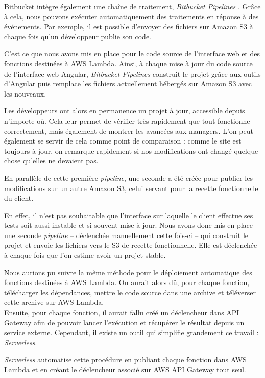 Bitbucket intègre également une chaîne de traitement,
\textit{Bitbucket Pipelines}\cite{noauthor_bitbucket_nodate-1}
. Grâce à cela, nous pouvons exécuter automatiquement des traitements en réponse à des événements. Par exemple, il est possible d'envoyer des fichiers sur Amazon S3 à chaque fois qu'un développeur publie son code.

C'est ce que nous avons mis en place pour le code source de l'interface web et des fonctions destinées à AWS Lambda.
Ainsi, à chaque mise à jour du code source de l'interface web Angular, \textit{Bitbucket Pipelines} construit le projet grâce aux outils d'Angular puis remplace les fichiers actuellement hébergés sur Amazon S3 avec les nouveaux.

Les développeurs ont alors en permanence un projet à jour, accessible depuis n'importe où.
Cela leur permet de vérifier très rapidement que tout fonctionne correctement, mais également de montrer les avancées aux managers. L'on peut également se servir de cela comme point de comparaison : comme le site est toujours à jour, on remarque rapidement si nos modifications ont changé quelque chose qu'elles ne devaient pas.

En parallèle de cette première \textit{pipeline}, une seconde a été créée pour publier les modifications sur un autre Amazon S3, celui servant pour la recette fonctionnelle du client.

En effet, il n'est pas souhaitable que l'interface sur laquelle le client effectue ses tests soit aussi instable et si souvent mise à jour. Nous avons donc mis en place une seconde \textit{pipeline} -- déclenchée manuellement cette fois-ci -- qui construit le projet et envoie les fichiers vers le S3 de recette fonctionnelle.
Elle est déclenchée à chaque fois que l'on estime avoir un projet stable.

Nous aurions pu suivre la même méthode pour le déploiement automatique des fonctions destinées à AWS Lambda. On aurait alors dû, pour chaque fonction, télécharger les dépendances, mettre le code source dans une archive et téléverser cette archive sur AWS Lambda.\\
Ensuite, pour chaque fonction, il aurait fallu créé un déclencheur dans API Gateway afin de pouvoir lancer l'exécution et récupérer le résultat depuis un service externe.
Cependant, il existe un outil qui simplifie grandement ce travail : \textit{Serverless}\cite{noauthor_serverless_nodate}.

\textit{Serverless} automatise cette procédure en publiant chaque fonction dans AWS Lambda et en créant le déclencheur associé sur AWS API Gateway tout seul.

